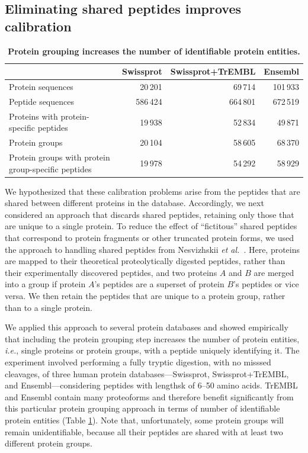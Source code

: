 \documentclass{article}
\begin{document}
\subsection*{Eliminating shared peptides improves calibration}

\begin{table}
\caption{\label{tab:duplicate-proteins}\textbf{Protein grouping
    increases the number of identifiable protein entities.}}
\scriptsize
\begin{center}
\begin{tabular}{lrrr}
\hline
& Swissprot & Swissprot+TrEMBL & Ensembl\\
\hline
Protein sequences & 20\,201 & 69\,714 & 101\,933\\
Peptide sequences & 586\,424 & 664\,801 & 672\,519\\
Proteins with protein-specific peptides & 19\,938 & 52\,834 &
49\,871\\
Protein groups & 20\,104 & 58\,605 & 68\,370\\
Protein groups with protein group-specific peptides & 19\,978 &
54\,292 & 58\,929\\
\hline
\end{tabular}
\end{center}
\end{table}

We hypothesized that these calibration problems arise from the
peptides that are shared between different proteins in the database.
Accordingly, we next considered an approach that discards shared
peptides, retaining only those that are unique to a single protein.
To reduce the effect of ``fictitous'' shared peptides that correspond
to protein fragments or other truncated protein forms, we used the
approach to handling shared peptides from Nesvizhskii {\em et
  al.}~\cite{nesvizhskii2003statistical}. Here, proteins are mapped to
their theoretical proteolytically digested peptides, rather than their
experimentally discovered peptides, and two proteins $A$ and $B$ are
merged into a group if protein $A$'s peptides are a superset of
protein $B$'s peptides or vice versa.  We then retain the peptides
that are unique to a protein group, rather than to a single protein.

We applied this approach to several protein databases and showed
empirically that including the protein grouping step increases the
number of protein entities, {\em i.e.}, single proteins or protein
groups, with a peptide uniquely identifying it.  The experiment
involved performing a fully tryptic digestion, with no misssed
cleavages, of three human protein databases---Swissprot,
Swissprot+TrEMBL, and Ensembl---considering peptides with lengthsk of
6--50 amino acids. TrEMBL and Ensembl contain many proteoforms and
therefore benefit significantly from this particular protein grouping
approach in terms of number of identifiable protein entities (Table
\ref{tab:duplicate-proteins}). Note that, unfortunately, some protein
groups will remain unidentifiable, because all their peptides are
shared with at least two different protein groups.
\end{document}
